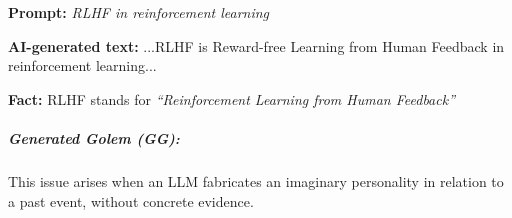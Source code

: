 \vspace{-4mm}
\begin{tcolorbox}[enhanced,attach boxed title to top right={yshift=-2.5mm,yshifttext=-1mm},
left=1pt,right=1pt,top=1pt,bottom=1pt,  colback=blue!5!white,colframe=blue!75!black,colbacktitle=violet!80!black,
  title=moderate,fonttitle=\ttfamily\bfseries\scshape\fontsize{9}{9.6}\selectfont,
  boxed title style={size=small,colframe=violet!50!black} ]

\begin{spacing}{0.75}
  \textbf{\scriptsize
  Prompt:} 
  \textit{\scriptsize RLHF in reinforcement learning}
  \end{spacing}

  \vspace{-2mm}
  \DrawLine

  \begin{spacing}{0.75}
  \textbf{\scriptsize AI-generated text:} {\scriptsize\selectfont
  ...RLHF is Reward-free Learning from Human Feedback in reinforcement learning...}
  \end{spacing}

  \vspace{-2mm}
  \DrawLine

  \textbf{\scriptsize Fact:} \scriptsize RLHF stands for \textit{ ``Reinforcement Learning from Human Feedback''}

\end{tcolorbox}
\vspace{-4mm}

\subparagraph{Generated Golem (GG):} This issue arises when an LLM fabricates an imaginary personality in relation to a past event, without concrete evidence. 

